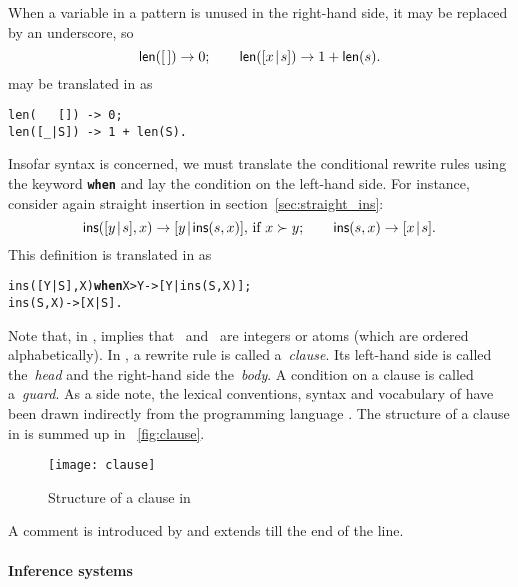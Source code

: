 When a variable in a pattern is unused in the right\hyp{}hand side, it
may be replaced by an underscore, so
\begin{equation*}
\textsf{len}([\,])         \rightarrow 0;\qquad
\textsf{len}([{x}\!\mid\!{s}]) \rightarrow 1 + \textsf{len}(s).
\end{equation*}
may be translated in \Erlang as
\begin{verbatim}
len(   []) -> 0;
len([_|S]) -> 1 + len(S).
\end{verbatim}
Insofar syntax is concerned, we must translate the conditional rewrite
rules using the keyword \texttt{\textbf{when}} and lay the condition
on the left\hyp{}hand side. For instance, consider again straight
insertion in section~\ref{sec:straight_ins}:
\begin{equation*}
\textsf{ins}([{y}\!\mid\!{s}],x) \rightarrow
[{y}\!\mid\!{\textsf{ins}(s,x)}], \,\text{if \(x \succ y\)};\qquad
\textsf{ins}(s,x) \rightarrow [{x}\!\mid\!{s}].
\end{equation*}
This definition is translated in \Erlang as
\begin{alltt}
ins([Y|S],X) \textbf{when} X > Y -> [Y|ins(S,X)];
ins(    S,X)            -> [X|S].
\end{alltt}
Note that, in \Erlang,  implies that
~and~ are integers or atoms (which are ordered
alphabetically). In \Erlang, a rewrite rule is called
a~\emph{clause}. Its left\hyp{}hand side is called the~\emph{head} and
the right\hyp{}hand side the~\emph{body}. A condition on a clause is
called a~\emph{guard}. As a side note, the lexical conventions, syntax
and vocabulary of \Erlang have been drawn indirectly from the \Prolog
programming language \citep{SterlingShapiro_1994,Bratko_2000}. The
structure of a clause in \Erlang is summed up in
\fig~\vref{fig:clause}.
\begin{figure}[t]
\centering
\texttt{[image: clause]}
\caption{Structure of a clause in \Erlang\label{fig:clause}}
\end{figure}

A comment is introduced by \erlcode{\%} and extends till the end of
the line.

\paragraph{Inference systems}

